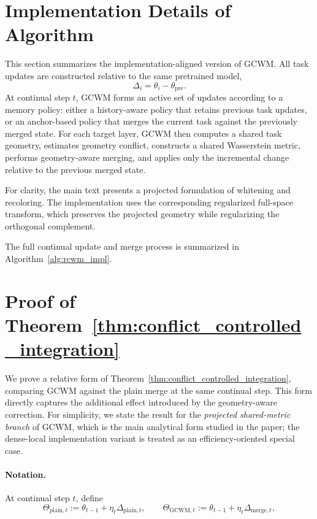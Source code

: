 \documentclass{article}
\begin{document}
\section{Implementation Details of Algorithm}
\label{app:algorithm}

This section summarizes the implementation-aligned version of GCWM. All task updates are constructed relative to the same pretrained model,
\[
\Delta_i = \theta_i - \theta_{\mathrm{pre}}.
\]
At continual step \(t\), GCWM forms an active set of updates according to a memory policy: either a history-aware policy that retains previous task updates, or an anchor-based policy that merges the current task against the previously merged state. For each target layer, GCWM then computes a shared task geometry, estimates geometry conflict, constructs a shared Wasserstein metric, performs geometry-aware merging, and applies only the incremental change relative to the previous merged state.

For clarity, the main text presents a projected formulation of whitening and recoloring. The implementation uses the corresponding regularized full-space transform, which preserves the projected geometry while regularizing the orthogonal complement.

The full continual update and merge process is summarized in Algorithm~\ref{alg:rcwm_impl}.





\section{Proof of Theorem~\ref{thm:conflict_controlled_integration}}
\label{app:proof_conflict_controlled_integration}

We prove a relative form of Theorem~\ref{thm:conflict_controlled_integration}, comparing GCWM against the plain merge at the same continual step. This form directly captures the additional effect introduced by the geometry-aware correction. For simplicity, we state the result for the \emph{projected shared-metric branch} of GCWM, which is the main analytical form studied in the paper; the dense-local implementation variant is treated as an efficiency-oriented special case.

\paragraph{Notation.}
At continual step \(t\), define
\[
\Theta_{\mathrm{plain},t}
:=
\theta_{t-1}+\eta_t \Delta_{\mathrm{plain},t},
\qquad
\Theta_{\mathrm{GCWM},t}
:=
\theta_{t-1}+\eta_t \Delta_{\mathrm{merge},t},
\]
\end{document}

